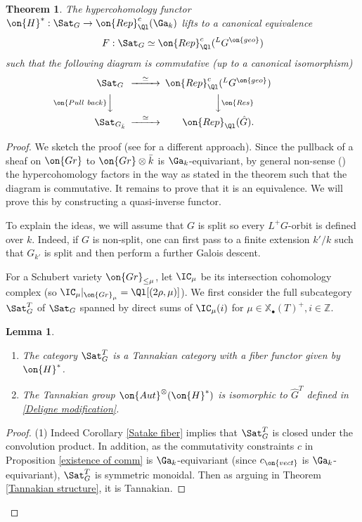 \documentclass[]{pcmi}
\theoremstyle{plain}
\newtheorem{thm}[equation]{Theorem}
\newtheorem{lem}[equation]{Lemma}
\theoremstyle{remark}
\theoremstyle{definition}
\newcommand{\bZ}{{\mathbb Z}}
\newcommand{\Aut}{{\on{Aut}}}
\newcommand{\Gr}{{\on{Gr}}}
\newcommand{\Res}{{\on{Res}}}
\def\xcoch{\mathbb{X}_\bullet}
\begin{document}
\begin{thm}\label{full Sat equiv}
The  hypercohomology functor $\on{H}^*:\Sat_G\to \on{Rep}^c_{\Ql}(\Ga_k)$ lifts to a canonical equivalence 
\begin{equation}\label{full Sat}
F:\Sat_G\simeq \on{Rep}^c_{\Ql}({^L}G^{\on{geo}})
\end{equation} 
such that the following diagram is commutative (up to a canonical isomorphism)
\[\begin{CD}
\Sat_G@>\simeq>> \on{Rep}^c_{\Ql}({^L}G^{\on{geo}})\\
@V\on{Pull\ back}VV@VV\Res V\\
\Sat_{G_{\bar k}}@>\simeq>> \on{Rep}_{\Ql}(\hat G).
\end{CD}\]
\end{thm}
\begin{proof}
We sketch the proof (see \cite[\S~5]{Ri} for a different approach). Since the pullback of a sheaf on $\Gr$ to $\Gr\otimes \bar k$ is $\Ga_k$-equivariant, by general non-sense (\cite[Lemma A.3]{RZ}) the hypercohomology factors in the way as stated in the theorem such that the diagram is commutative. It remains to prove that it is an equivalence. We will prove this by constructing a quasi-inverse functor. 

To explain the ideas, we will assume that $G$ is split so every $L^+G$-orbit is defined over $k$. Indeed, if $G$ is non-split, one can first pass to a finite extension $k'/k$ such that $G_{k'}$ is split and then perform a further Galois descent.

For a Schubert variety $\Gr_{\leq \mu}$, let  $\IC_\mu$ be its intersection cohomology complex (so $\IC_\mu|_{\Gr_\mu}=\Ql[(2\rho,\mu)]$). 
We first consider the full subcategory $\Sat_G^T$ of $\Sat_G$ spanned by direct sums of $\IC_\mu(i)$ for  $\mu\in \xcoch(T)^+, i\in \bZ$. 

\begin{lem}~
\begin{enumerate}
\item The category $\Sat_G^T$ is a Tannakian category with a fiber functor given by $\on{H}^*$.

\item The Tannakian group $\Aut^{\otimes}(\on{H}^*)$ is isomorphic to $\hat G^T$ defined in \eqref{Deligne modification}.
\end{enumerate}
\end{lem}
\begin{proof}
(1) Indeed Corollary \ref{Satake fiber} implies that  $\Sat_G^T$ is closed under the convolution product. In addition, as the commutativity constraints $c$ in Proposition \ref{existence of comm} is $\Ga_k$-equivariant (since $c_{\on{vect}}$ is $\Ga_k$-equivariant),  $\Sat_G^T$ is symmetric monoidal. Then as arguing in Theorem \ref{Tannakian structure}, it is Tannakian.


\end{proof}
\end{proof}
\end{document}
